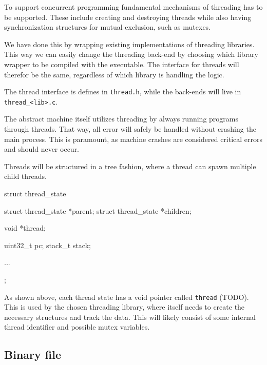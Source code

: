 To support concurrent programming fundamental mechanisms of threading has to be
supported. These include creating and destroying threads while also having
synchronization structures for mutual exclusion, such as mutexes.

We have done this by wrapping existing implementations of threading libraries.
This way we can easily change the threading back-end by choosing which library
wrapper to be compiled with the executable. The interface for threads will
therefor be the same, regardless of which library is handling the logic.

The thread interface is defines in {\tt thread.h}, while the back-ends will live
in {\tt thread\_<lib>.c}.

The abstract machine itself utilizes threading by always running programs
through threads. That way, all error will safely be handled without crashing the
main process. This is paramount, as machine crashes are considered critical
errors and should never occur.

Threads will be structured in a tree fashion, where a thread can spawn multiple
child threads.
\begin{ccode}
struct thread_state {
    struct thread_state *parent;
    struct thread_state *children;

    void *thread;

    uint32_t pc;
    stack_t stack;

    ...
};
\end{ccode}

As shown above, each thread state has a void pointer called {\tt thread}
(TODO). This is used by the chosen threading library, where itself needs to
create the necessary structures and track the data. This will likely consist of
some internal thread identifier and possible mutex variables.


\subsection{Binary file}





